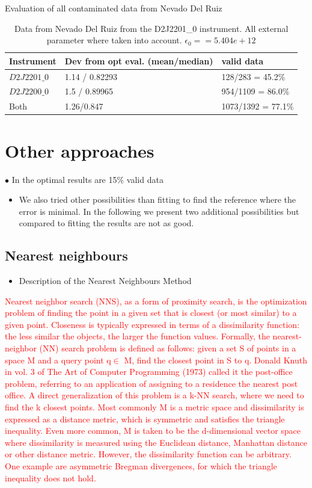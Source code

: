 \documentclass  [
  paper    = a4,
  BCOR     = 10mm,
  twoside,
  fontsize = 12pt,
  fleqn,
  toc      = bibnumbered,
  toc      = listofnumbered,
  numbers  = noendperiod,
  headings = normal,
  listof   = leveldown,
  version  = 3.03
]                                       {scrreprt}
\begin{document}
	\begin{table}[h]
		\centering
		{Evaluation of all contaminated data from Nevado Del Ruiz}
		\vspace*{1cm}
		\begin{tabular}{|p{2.2cm}|p{4.4cm}|p{5.0cm}|}
			\toprule
			Instrument& Dev from opt eval. (mean/median) & valid data\\
			\toprule
			$D2J2201\_0$ &1.14 / 0.82293& 128/283 = 45.2\%\\
			\midrule
			$D2J2200\_0$ &1.5 / 0.89965&954/1109 = 86.0\%\\
			\midrule 
			Both &1.26/0.847&1073/1392 = 77.1\%\\
			\bottomrule
		\end{tabular}
	\caption{Data from Nevado Del Ruiz from the D2J2201\_0 instrument. All external parameter where taken into account. $\epsilon_{0} = =  5.404e+12$}
	\end{table}
	\section{Other approaches}

	$\bullet$ In the optimal results are 15$\%$ valid data
	\begin{itemize}
		\item We also tried other possibilities than fitting to find the reference where the  error is minimal. In the following we present two additional possibilities but compared to fitting the results are not as good.
	\end{itemize}
	\subsection{Nearest neighbours}
	\begin{itemize}
		\item Description of the Nearest Neighbours Method
	\end{itemize}
		\textcolor{red}{Nearest neighbor search (NNS), as a form of proximity search, is the optimization problem of finding the point in a given set that is closest (or most similar) to a given point. Closeness is typically expressed in terms of a dissimilarity function: the less similar the objects, the larger the function values. Formally, the nearest-neighbor (NN) search problem is defined as follows: given a set S of points in a space M and a query point q$\in$ M, find the closest point in S to q. Donald Knuth in vol. 3 of The Art of Computer Programming (1973) called it the post-office problem, referring to an application of assigning to a residence the nearest post office. A direct generalization of this problem is a k-NN search, where we need to find the k closest points.	
		Most commonly M is a metric space and dissimilarity is expressed as a distance metric, which is symmetric and satisfies the triangle inequality. Even more common, M is taken to be the d-dimensional vector space where dissimilarity is measured using the Euclidean distance, Manhattan distance or other distance metric. However, the dissimilarity function can be arbitrary. One example are asymmetric Bregman divergences, for which the triangle inequality does not hold.}
\end{document}
